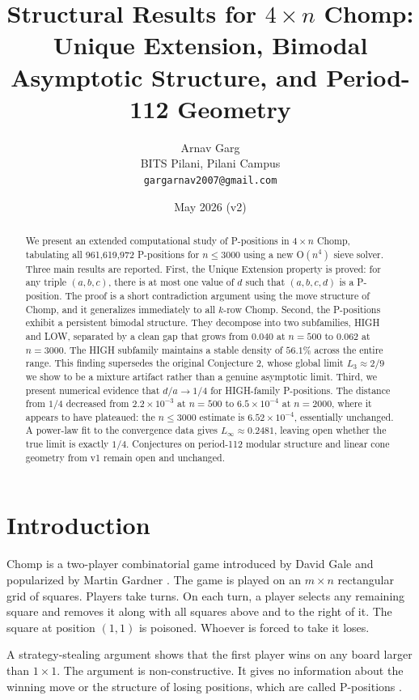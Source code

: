 \documentclass[12pt]{article}
\title{Structural Results for $4 \times n$ Chomp:\\
Unique Extension, Bimodal Asymptotic Structure, and Period-112 Geometry}
\author{Arnav Garg \\
\small BITS Pilani, Pilani Campus \\
\small \texttt{gargarnav2007@gmail.com}}
\date{May 2026 (v2)}
\begin{document}
\maketitle

\begin{abstract}
We present an extended computational study of P-positions in $4 \times n$
Chomp, tabulating all 961,619,972 P-positions for $n \leq 3000$ using
a new O$(n^4)$ sieve solver. Three main results are reported. First,
the Unique Extension property is proved: for any triple $(a,b,c)$, there
is at most one value of $d$ such that $(a,b,c,d)$ is a P-position. The
proof is a short contradiction argument using the move structure of Chomp,
and it generalizes immediately to all $k$-row Chomp. Second, the
P-positions exhibit a persistent bimodal structure. They decompose into
two subfamilies, HIGH and LOW, separated by a clean gap that grows from
$0.040$ at $n = 500$ to $0.062$ at $n = 3000$. The HIGH subfamily
maintains a stable density of $56.1\%$ across the entire range. This
finding supersedes the original Conjecture 2, whose global limit
$L_3 \approx 2/9$ we show to be a mixture artifact rather than a
genuine asymptotic limit. Third, we present numerical evidence
that $d/a \to 1/4$ for HIGH-family P-positions. The distance from $1/4$
decreased from $2.2 \times 10^{-3}$ at $n = 500$ to $6.5 \times 10^{-4}$
at $n = 2000$, where it appears to have plateaued: the $n \leq 3000$
estimate is $6.52 \times 10^{-4}$, essentially unchanged. A power-law
fit to the convergence data gives $L_\infty \approx 0.2481$, leaving open
whether the true limit is exactly $1/4$. Conjectures on period-112 modular
structure and linear cone geometry from v1 remain open and unchanged.
\end{abstract}

\section{Introduction}

Chomp is a two-player combinatorial game introduced by David Gale
\cite{gale1974} and popularized by Martin Gardner \cite{gardner1973}.
The game is played on an $m \times n$ rectangular grid of squares.
Players take turns. On each turn, a player selects any remaining square
and removes it along with all squares above and to the right of it.
The square at position $(1,1)$ is poisoned. Whoever is forced to take
it loses.

A strategy-stealing argument shows that the first player wins on any
board larger than $1 \times 1$. The argument is non-constructive. It
gives no information about the winning move or the structure of losing
positions, which are called P-positions \cite{berlekamp2001}.
\end{document}
